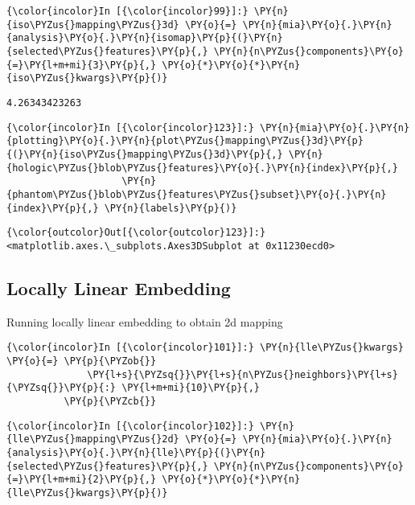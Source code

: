     \begin{Verbatim}[commandchars=\\\{\}]
{\color{incolor}In [{\color{incolor}99}]:} \PY{n}{iso\PYZus{}mapping\PYZus{}3d} \PY{o}{=} \PY{n}{mia}\PY{o}{.}\PY{n}{analysis}\PY{o}{.}\PY{n}{isomap}\PY{p}{(}\PY{n}{selected\PYZus{}features}\PY{p}{,} \PY{n}{n\PYZus{}components}\PY{o}{=}\PY{l+m+mi}{3}\PY{p}{,} \PY{o}{*}\PY{o}{*}\PY{n}{iso\PYZus{}kwargs}\PY{p}{)}
\end{Verbatim}

    \begin{Verbatim}[commandchars=\\\{\}]
4.26343423263
    \end{Verbatim}

    \begin{Verbatim}[commandchars=\\\{\}]
{\color{incolor}In [{\color{incolor}123}]:} \PY{n}{mia}\PY{o}{.}\PY{n}{plotting}\PY{o}{.}\PY{n}{plot\PYZus{}mapping\PYZus{}3d}\PY{p}{(}\PY{n}{iso\PYZus{}mapping\PYZus{}3d}\PY{p}{,} \PY{n}{hologic\PYZus{}blob\PYZus{}features}\PY{o}{.}\PY{n}{index}\PY{p}{,} 
					\PY{n}{phantom\PYZus{}blob\PYZus{}features\PYZus{}subset}\PY{o}{.}\PY{n}{index}\PY{p}{,} \PY{n}{labels}\PY{p}{)}
\end{Verbatim}

            \begin{Verbatim}[commandchars=\\\{\}]
{\color{outcolor}Out[{\color{outcolor}123}]:} <matplotlib.axes.\_subplots.Axes3DSubplot at 0x11230ecd0>
\end{Verbatim}

    \subsection{Locally Linear Embedding}\label{locally-linear-embedding}

Running locally linear embedding to obtain 2d mapping

    \begin{Verbatim}[commandchars=\\\{\}]
{\color{incolor}In [{\color{incolor}101}]:} \PY{n}{lle\PYZus{}kwargs} \PY{o}{=} \PY{p}{\PYZob{}}
              \PY{l+s}{\PYZsq{}}\PY{l+s}{n\PYZus{}neighbors}\PY{l+s}{\PYZsq{}}\PY{p}{:} \PY{l+m+mi}{10}\PY{p}{,}
          \PY{p}{\PYZcb{}}
\end{Verbatim}

    \begin{Verbatim}[commandchars=\\\{\}]
{\color{incolor}In [{\color{incolor}102}]:} \PY{n}{lle\PYZus{}mapping\PYZus{}2d} \PY{o}{=} \PY{n}{mia}\PY{o}{.}\PY{n}{analysis}\PY{o}{.}\PY{n}{lle}\PY{p}{(}\PY{n}{selected\PYZus{}features}\PY{p}{,} \PY{n}{n\PYZus{}components}\PY{o}{=}\PY{l+m+mi}{2}\PY{p}{,} \PY{o}{*}\PY{o}{*}\PY{n}{lle\PYZus{}kwargs}\PY{p}{)}
\end{Verbatim}

